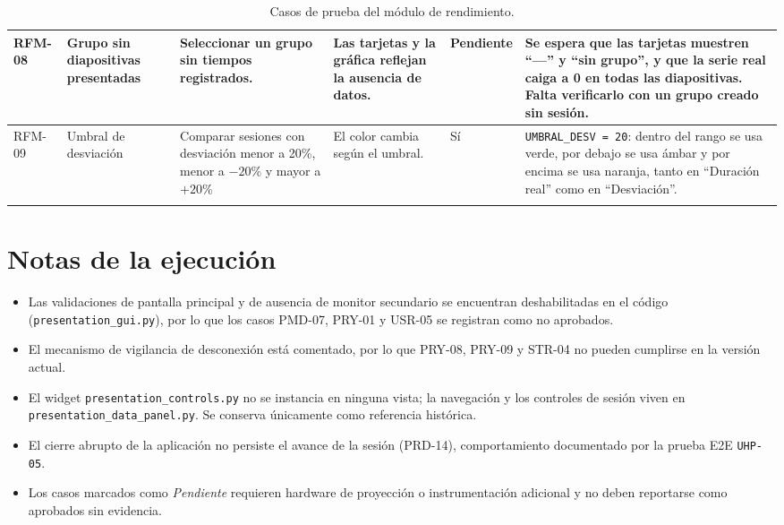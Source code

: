 \documentclass[12pt,letterpaper]{article}
\begin{document}
{\begin{longtable}{|L{1.1cm}|L{2.3cm}|L{3.2cm}|L{3.6cm}|L{1.2cm}|L{3.6cm}|}
RFM-08 & Grupo sin diapositivas presentadas & Seleccionar un grupo sin tiempos registrados. & Las tarjetas y la gráfica reflejan la ausencia de datos. & Pendiente & Se espera que las tarjetas muestren ``---'' y ``sin grupo'', y que la serie real caiga a 0 en todas las diapositivas. Falta verificarlo con un grupo creado sin sesión. \\ \hline
RFM-09 & Umbral de desviación & Comparar sesiones con desviación menor a 20\%, menor a $-20$\% y mayor a $+20$\% & El color cambia según el umbral. & Sí & \texttt{UMBRAL\_DESV = 20}: dentro del rango se usa verde, por debajo se usa ámbar y por encima se usa naranja, tanto en ``Duración real'' como en ``Desviación''. \\ \hline
\caption{Casos de prueba del módulo de rendimiento.}
\label{tab:casos-prueba-modulo-rendimiento}
\end{longtable}
}

\clearpage
\section*{Notas de la ejecución}

\begin{itemize}
    \item Las validaciones de pantalla principal y de ausencia de monitor secundario se encuentran deshabilitadas en el código (\texttt{presentation\_gui.py}), por lo que los casos PMD-07, PRY-01 y USR-05 se registran como no aprobados.
    \item El mecanismo de vigilancia de desconexión está comentado, por lo que PRY-08, PRY-09 y STR-04 no pueden cumplirse en la versión actual.
    \item El widget \texttt{presentation\_controls.py} no se instancia en ninguna vista; la navegación y los controles de sesión viven en \texttt{presentation\_data\_panel.py}. Se conserva únicamente como referencia histórica.
    \item El cierre abrupto de la aplicación no persiste el avance de la sesión (PRD-14), comportamiento documentado por la prueba E2E \texttt{UHP-05}.
    \item Los casos marcados como \emph{Pendiente} requieren hardware de proyección o instrumentación adicional y no deben reportarse como aprobados sin evidencia.
\end{itemize}
\end{document}
